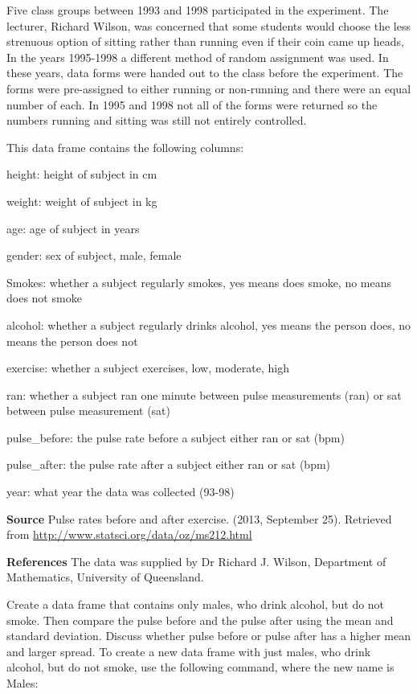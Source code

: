 \documentclass[
]{book}
\begin{document}
Five class groups between 1993 and 1998 participated in the experiment. The lecturer, Richard Wilson, was concerned that some students would choose the less strenuous option of sitting rather than running even if their coin came up heads, In the years 1995-1998 a different method of random assignment was used. In these years, data forms were handed out to the class before the experiment. The forms were pre-assigned to either running or non-running and there were an equal number of each. In 1995 and 1998 not all of the forms were returned so the numbers running and sitting was still not entirely controlled.

This data frame contains the following columns:

height: height of subject in cm

weight: weight of subject in kg

age: age of subject in years

gender: sex of subject, male, female

Smokes: whether a subject regularly smokes, yes means does smoke, no means does not smoke

alcohol: whether a subject regularly drinks alcohol, yes means the person does, no means the person does not

exercise: whether a subject exercises, low, moderate, high

ran: whether a subject ran one minute between pulse measurements (ran) or sat between pulse measurement (sat)

pulse\_before: the pulse rate before a subject either ran or sat (bpm)

pulse\_after: the pulse rate after a subject either ran or sat (bpm)

year: what year the data was collected (93-98)

\textbf{Source}
Pulse rates before and after exercise. (2013, September 25). Retrieved from
\url{http://www.statsci.org/data/oz/ms212.html}

\textbf{References}
The data was supplied by Dr Richard J. Wilson, Department of Mathematics, University of Queensland.

Create a data frame that contains only males, who drink alcohol, but do not smoke. Then compare the pulse before and the pulse after using the mean and standard deviation. Discuss whether pulse before or pulse after has a higher mean and larger spread. To create a new data frame with just males, who drink alcohol, but do not smoke, use the following command, where the new name is Males:
\end{document}
